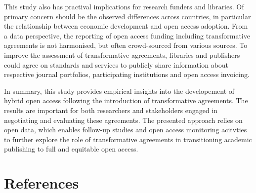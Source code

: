 \documentclass[a4paper,man,floatsintext,longtable,noextraspace,12pt]{apa6}
\begin{document}
This study also has practival implications for research funders and
libraries. Of primary concern should be the observed differences across
countries, in particular the relationship between economic development
and open access adoption. From a data perspective, the reporting of open
access funding including transformative agreements is not harmonised,
but often crowd-sourced from various sources. To improve the assessment
of transformative agreements, libraries and publishers could agree on
standards and services to publicly share information about respective
journal portfolios, participating institutions and open access
invoicing.

In summary, this study provides empirical insights into the developement
of hybrid open access following the introduction of transformative
agreements. The results are important for both researchers and
stakeholders engaged in negotiating and evaluating these agreements. The
presented approach relies on open data, which enables follow-up studies
and open access monitoring acitvties to further explore the role of
transformative agreements in transitioning academic publishing to full
and equitable open access.

\hypertarget{references}{%
\section*{References}\label{references}}
\end{document}
